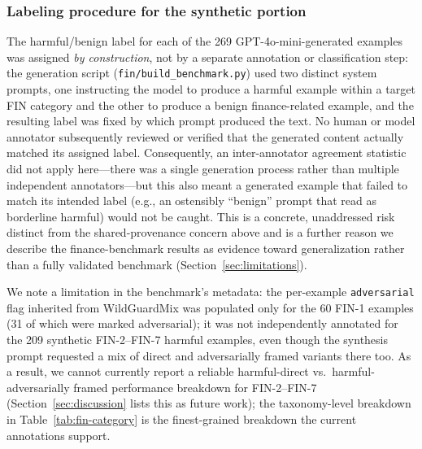 \documentclass[superintelligence,article,accept,moreauthors]{Definitions/mdpi}
\begin{document}
\subsubsection{Labeling procedure for the synthetic portion %
} The harmful/benign label for each of the 269 GPT-4o-mini-generated examples was assigned \emph{by construction}, not by a separate annotation or classification step: the generation script (\texttt{fin/build\_benchmark.py}) used two distinct system prompts, one instructing the model to produce a harmful example within a target FIN category and the other to produce a benign finance-related example, and the resulting label was fixed by which prompt produced the text. No human or model annotator subsequently reviewed or verified that the generated content actually matched its assigned label. Consequently, an inter-annotator agreement statistic did not apply here---there was a single generation process rather than multiple independent annotators---but this also meant a generated example that failed to match its intended label (e.g., an ostensibly ``benign'' prompt that read as borderline harmful) would not be caught. This is a concrete, unaddressed risk distinct from the shared-provenance concern above and is a further reason we describe the finance-benchmark results as evidence toward generalization rather than a fully validated benchmark (Section~\ref{sec:limitations}).

We note a limitation in the benchmark's metadata: the per-example \texttt{adversarial} flag inherited from WildGuardMix was populated only for the 60 FIN-1 examples (31 of which were marked adversarial); it was not independently annotated for the 209 synthetic FIN-2--FIN-7 harmful examples, even though the synthesis prompt requested a mix of direct and adversarially framed variants there too. As a result, we cannot currently report a reliable harmful-direct vs.\ harmful-adversarially framed performance breakdown for FIN-2--FIN-7 (Section~\ref{sec:discussion} lists this as future work); the taxonomy-level breakdown in Table~\ref{tab:fin-category} is the finest-grained breakdown the current annotations support.
\end{document}
